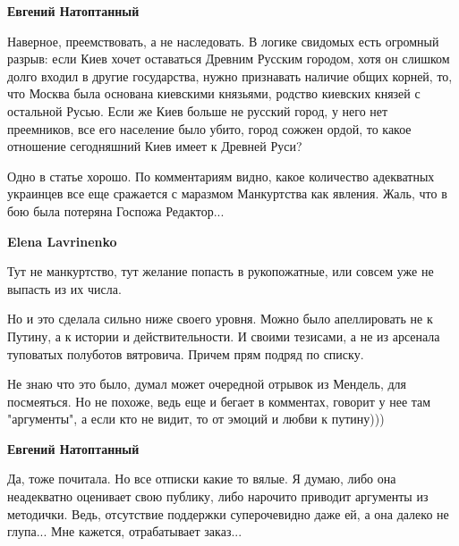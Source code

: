 \begin{itemize}
\begin{itemize}
 
\textbf{Евгений Натоптанный} 

Наверное, преемствовать, а не наследовать. В логике свидомых есть огромный
разрыв: если Киев хочет оставаться Древним Русским городом, хотя он слишком
долго входил в другие государства, нужно признавать наличие общих корней, то,
что Москва была основана киевскими князьями, родство киевских князей с
остальной Русью. Если же Киев больше не русский город, у него нет преемников,
все его население было убито, город сожжен ордой, то какое отношение
сегодняшний Киев имеет к Древней Руси?

Одно в статье хорошо. По комментариям видно, какое количество адекватных
украинцев все еще сражается с маразмом Манкуртства как явления. Жаль, что в бою
была потеряна Госпожа Редактор...

 

\textbf{Elena Lavrinenko} 

Тут не манкуртство, тут желание попасть в рукопожатные, или совсем уже не
выпасть из их числа.

Но и это сделала сильно ниже своего уровня. Можно было апеллировать не к
Путину, а к истории и действительности. И своими тезисами, а не из арсенала
туповатых полуботов вятровича. Причем прям подряд по списку.

Не знаю что это было, думал может очередной отрывок из Мендель, для посмеяться.
Но не похоже, ведь еще и бегает в комментах, говорит у нее там "аргументы", а
если кто не видит, то от эмоций и любви к путину)))

 
\textbf{Евгений Натоптанный} 

Да, тоже почитала. Но все отписки какие то вялые. Я думаю, либо она неадекватно
оценивает свою публику, либо нарочито приводит аргументы из методички. Ведь,
отсутствие поддержки суперочевидно даже ей, а она далеко не глупа... Мне
кажется, отрабатывает заказ...


\end{itemize}
\end{itemize}
